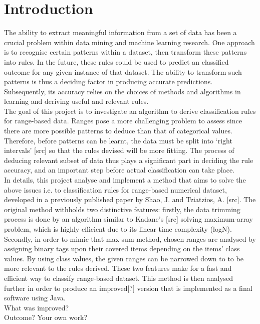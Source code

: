 \chapter{Introduction}

The ability to extract meaningful information from a set of data has been a crucial problem within data mining and machine learning research. One approach is to recognise certain patterns within a dataset, then transform these patterns into rules. In the future, these rules could be used to predict an classified outcome for any given instance of that dataset. The ability to transform such patterns is thus a deciding factor in producing accurate predictions. Subsequently, its accuracy relies on the choices of methods and algorithms in learning and deriving useful and relevant rules. \\

The goal of this project is to investigate an algorithm to derive classification rules for range-based data. Ranges pose a more challenging problem to assess since there are more possible patterns to deduce than that of categorical values. Therefore, before patterns can be learnt, the data must be split into `right intervals' [src] so that the rules devised will be more fitting. The process of deducing relevant subset of data thus plays a significant part in deciding the rule accuracy, and an important step before actual classification can take place. \\


In details, this project analyse and implement a method that aims to solve the above issues i.e. to classification rules for range-based numerical dataset, developed in a previously published paper by Shao, J. and Tziatzios, A. [src]. The original method withholds two distinctive features: firstly, the data trimming process is done by an algorithm similar to Kadane's [src] solving maximum-array problem, which is highly efficient due to its linear time complexity (logN). Secondly, in order to mimic that max-sum method, chosen ranges are analysed by assigning binary tags upon their covered items depending on the items' class values. By using class values, the given ranges can be narrowed down to to be more relevant to the rules derived. These two features make for a fast and efficient way to classify range-based dataset. This method is then analysed further in order to produce an improved[?] version that is implemented as a final software using Java. \\

What was improved? \\

Outcome? Your own work? \\


